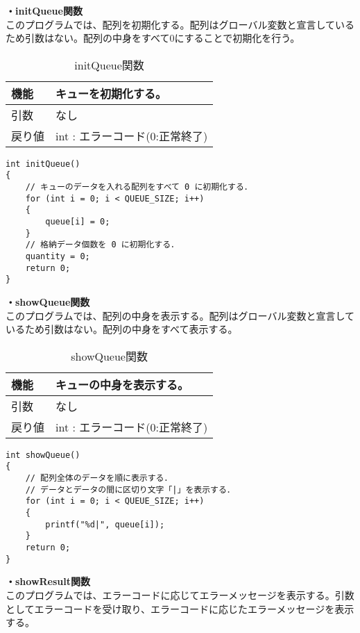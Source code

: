 \documentclass[dvipdfmx]{jsarticle}
\begin{document}
\textbf{・initQueue関数}\\
このプログラムでは、配列を初期化する。配列はグローバル変数と宣言しているため引数はない。配列の中身をすべて0にすることで初期化を行う。
\begin{table}[ht]
  \centering
  \caption{initQueue関数}
  \begin{tabular}{|p{5cm}|p{10cm}|}
    \hline
    機能  & キューを初期化する。                                      \\
    \hline
    引数  & なし \\
    \hline
    戻り値 & int : エラーコード(0:正常終了) \\
    \hline
  \end{tabular}
  \label{tab:initQueue_func}
\end{table}
\begin{lstlisting}[caption={initQueue関数}, label={lst:initQueue_func}]
int initQueue()
{
    // キューのデータを入れる配列をすべて 0 に初期化する．
    for (int i = 0; i < QUEUE_SIZE; i++)
    {
        queue[i] = 0;
    }
    // 格納データ個数を 0 に初期化する．
    quantity = 0;
    return 0;
}
\end{lstlisting}
\textbf{・showQueue関数}\\
このプログラムでは、配列の中身を表示する。配列はグローバル変数と宣言しているため引数はない。配列の中身をすべて表示する。
\begin{table}[ht]
  \centering
  \caption{showQueue関数}
  \begin{tabular}{|p{5cm}|p{10cm}|}
    \hline
    機能  & キューの中身を表示する。                                      \\
    \hline
    引数  & なし \\
    \hline
    戻り値 & int : エラーコード(0:正常終了) \\
    \hline
  \end{tabular}
  \label{tab:showQueue_func}
\end{table}
\begin{lstlisting}[caption={showQueue関数}, label={lst:showQueue_func}]
int showQueue()
{
    // 配列全体のデータを順に表示する．
    // データとデータの間に区切り文字「|」を表示する．
    for (int i = 0; i < QUEUE_SIZE; i++)
    {
        printf("%d|", queue[i]);
    }
    return 0;
}
\end{lstlisting}
\textbf{・showResult関数}\\
このプログラムでは、エラーコードに応じてエラーメッセージを表示する。引数としてエラーコードを受け取り、エラーコードに応じたエラーメッセージを表示する。
\end{document}
